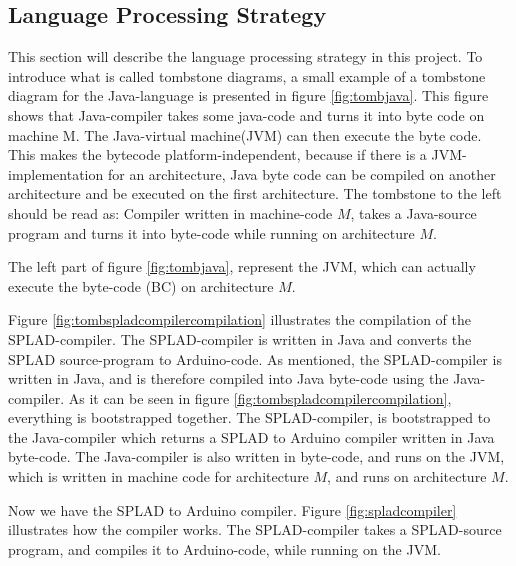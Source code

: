\subsection{Language Processing Strategy}
\label{sec:LanguageProcessingStrategy}
This section will describe the language processing strategy in this project. To introduce what is called tombstone diagrams, a small example of a tombstone diagram for the Java-language is presented in figure \ref{fig:tombjava}. This figure shows that Java-compiler takes some java-code and turns it into byte code on machine M. The Java-virtual machine(JVM) can then execute the byte code. This makes the bytecode platform-independent, because if there is a JVM-implementation for an architecture, Java byte code can be compiled on another architecture and be executed on the first architecture. The tombstone to the left should be read as: Compiler written in machine-code $M$, takes a Java-source program and turns it into byte-code while running on architecture $M$.


The left part of figure \ref{fig:tombjava}, represent the JVM, which can actually execute the byte-code (BC) on architecture $M$.

Figure \ref{fig:tombspladcompilercompilation} illustrates the compilation of the SPLAD-compiler. The SPLAD-compiler is written in Java and converts the SPLAD source-program to Arduino-code. As mentioned, the SPLAD-compiler is written in Java, and is therefore compiled into Java byte-code using the Java-compiler. As it can be seen in figure \ref{fig:tombspladcompilercompilation}, everything is bootstrapped together. The SPLAD-compiler, is bootstrapped to the Java-compiler which returns a SPLAD to Arduino compiler written in Java byte-code. The Java-compiler is also written in byte-code, and runs on the JVM, which is written in machine code for architecture $M$, and runs on architecture $M$.

Now we have the SPLAD to Arduino compiler. Figure \ref{fig:spladcompiler} illustrates how the compiler works. The SPLAD-compiler takes a SPLAD-source program, and compiles it to Arduino-code, while running on the JVM.

